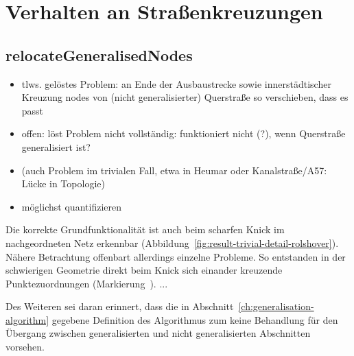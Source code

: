 \documentclass[../main/thesis.tex]{subfiles}
\begin{document}
\section{Verhalten an Straßenkreuzungen}

\subsection{relocateGeneralisedNodes}
\label{ch:relocateGeneralisedNodes}

\begin{itemize}
\item tlws. gelöstes Problem: an Ende der Ausbaustrecke sowie innerstädtischer Kreuzung nodes von (nicht generalisierter) Querstraße so verschieben, dass es passt
\item offen: löst Problem nicht vollständig: funktioniert nicht (?), wenn Querstraße generalisiert ist?
\item (auch Problem im trivialen Fall, etwa in Heumar oder Kanalstraße/A57: Lücke in Topologie)
\item möglichst quantifizieren
\end{itemize}


Die korrekte Grundfunktionalität ist auch beim scharfen Knick im nachgeordneten Netz
erkennbar (Abbildung~\ref{fig:result-trivial-detail-rolshover}).
Nähere Betrachtung offenbart allerdings einzelne Probleme.
So entstanden in der schwierigen Geometrie direkt beim Knick sich einander kreuzende Punktezuordnungen (Markierung~).
...

Des Weiteren sei daran erinnert, dass die in Abschnitt~\ref{ch:generalisation-algorithm} gegebene Definition des Algorithmus zum  keine Behandlung für den Übergang zwischen generalisierten und nicht generalisierten Abschnitten vorsehen.
\end{document}
